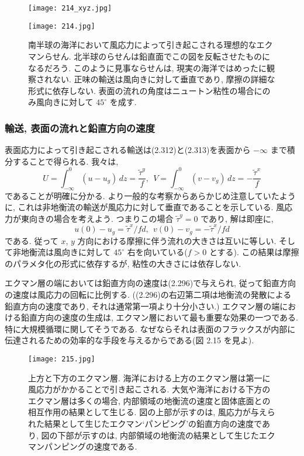 \documentclass[a4j,12pt,openbib,oneside,dvipdfmx]{jreport}
\begin{document}
\newpage
\clearpage
\begin{figure}[h]
  \texttt{[image: 214\_xyz.jpg]}
\end{figure}
\begin{figure}[ht]
  \centering
  \texttt{[image: 214.jpg]}
  \caption{南半球の海洋において風応力によって引き起こされる理想的なエクマンらせん. 北半球のらせんは鉛直面でこの図を反転させたものになるだろう. このように見事ならせんは, 現実の海洋ではめったに観察されない. 正味の輸送は風向きに対して垂直であり, 摩擦の詳細な形式に依存しない. 表面の流れの角度はニュートン粘性の場合にのみ風向きに対して $45^\circ$ を成す.}
\end{figure}
\newpage
\subsubsection{輸送, 表面の流れと鉛直方向の速度}
表面応力によって引き起こされる輸送は(2.312)と(2.313)を表面から $-\infty$ まで積分することで得られる. 我々は,
\begin{equation}
  U=\int_{-\infty}^0(u-u_g)\,dz=\frac{{\tilde\tau}^y}{f}, \ \ V=\int_{-\infty}^0(v-v_g)\,dz=-\frac{{\tilde\tau}^x}{f}
\end{equation}
であることが明確に分かる. より一般的な考察からあらかじめ注意していたように, これは非地衡流の輸送が風応力に対して垂直であることを示している. 風応力が東向きの場合を考えよう. つまりこの場合 ${\tilde\tau}^y=0$ であり, 解は即座に,
\begin{equation}
  u(0)-u_g={\tilde\tau}^x/fd, \ \ v(0)-v_g=-{\tilde\tau}^x/fd
\end{equation}
である. 従って $x$, $y$ 方向における摩擦に伴う流れの大きさは互いに等しい. そして非地衡流は風向きに対して $45^\circ$ 右を向いている($f>0$ とする). この結果は摩擦のパラメタ化の形式に依存するが, 粘性の大きさには依存しない.
\par
エクマン層の端においては鉛直方向の速度は(2.296)で与えられ, 従って鉛直方向の速度は風応力の回転に比例する. ((2.296)の右辺第二項は地衡流の発散による鉛直方向の速度であり, それは通常第一項より十分小さい.) エクマン層の端における鉛直方向の速度の生成は, エクマン層において最も重要な効果の一つである. 特に大規模循環に関してそうである. なぜならそれは表面のフラックスが内部に伝達されるための効率的な手段を与えるからである(図 2.15 を見よ).
\newpage
\begin{figure}[ht]
  \centering
  \texttt{[image: 215.jpg]}
  \caption{上方と下方のエクマン層. 海洋における上方のエクマン層は第一に風応力がかかることで引き起こされる. 大気や海洋における下方のエクマン層は多くの場合, 内部領域の地衡流の速度と固体底面との相互作用の結果として生じる. 図の上部が示すのは, 風応力が与えられた結果として生じたエクマン`パンピング'の鉛直方向の速度であり, 図の下部が示すのは, 内部領域の地衡流の結果として生じたエクマンパンピングの速度である.}
\end{figure}
\newpage
\end{document}
